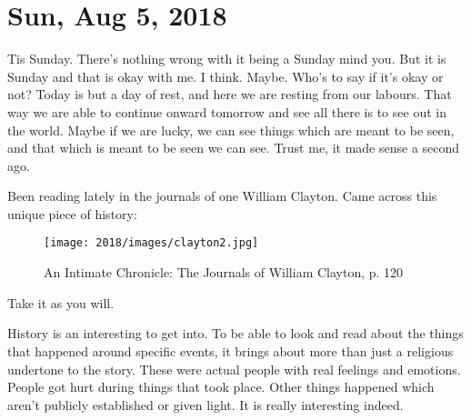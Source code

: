 \section{Sun, Aug 5, 2018}

Tis Sunday. There's nothing wrong with it being a Sunday mind you. But it is Sunday
and that is okay with me. I think. Maybe. Who's to say if it's okay or not? Today is
but a day of rest, and here we are resting from our labours. That way we are able to
continue onward tomorrow and see all there is to see out in the world. Maybe if we
are lucky, we can see things which are meant to be seen, and that which is meant to
be seen we can see. Trust me, it made sense a second ago.

Been reading lately in the journals of one William Clayton. Came across this unique
piece of history:

\begin{figure}[h!]
  \centering
  \texttt{[image: 2018/images/clayton2.jpg]}
  \caption{An Intimate Chronicle: The Journals of William Clayton, p. 120}
  \label{fig:clayton2}
\end{figure}

Take it as you will.

History is an interesting to get into. To be able to look and read about the things
that happened around specific events, it brings about more than just a religious
undertone to the story. These were actual people with real feelings and emotions.
People got hurt during things that took place. Other things happened which aren't
publicly established or given light. It is really interesting indeed.